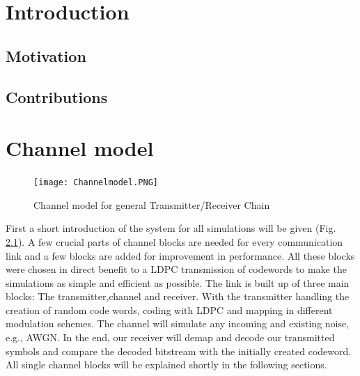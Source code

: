 \documentclass[12pt,oneside, reqno]{report}
\begin{document}


\tableofcontents

\newpage
\setlength{\baselineskip}{3ex}

\begin{spacing}{1.15}
\end{spacing}
\newpage
\thispagestyle{empty}
\null

\newpage
{}
\listoffigures

%

\newpage
\thispagestyle{empty}
\null
\newpage
\chapter{Introduction}
\section{Motivation}
\section{Contributions}

\newpage
\chapter{Channel model}
\label{sec:channelmodel}
\begin{figure}[H]
	\centering
	\texttt{[image: Channelmodel.PNG]}
	\caption{Channel model for general Transmitter/Receiver Chain}
	\label{fig:Channelmodel}
\end{figure}
First a short introduction of the system for all simulations will be given (Fig. \ref{fig:Channelmodel}). A few crucial parts of channel blocks are needed for every communication link and a few blocks are added for improvement in performance. All these blocks were chosen in direct benefit to a LDPC transmission of codewords to make the simulations as simple and efficient as possible. 
The link is built up of three main blocks: The transmitter,channel and receiver. With the transmitter handling the creation of random code words, coding with \gls{LDPC} and mapping in different modulation schemes. The channel will simulate any incoming and existing noise, e.g., \gls{AWGN}. In the end, our receiver will demap and decode our transmitted symbols and compare the decoded bitstream with the initially created codeword.
\newline
All single channel blocks will be explained shortly in the following sections.
\end{document}

